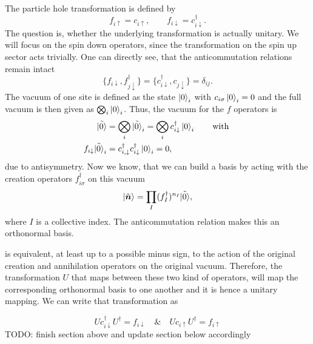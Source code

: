 \documentclass[../../../main.tex]{subfiles}
\begin{document}
The particle hole transformation is defined by 
\begin{equation*}
    f_{i\uparrow}=c_{i\uparrow}, \qquad f_{i\downarrow}=c_{i\downarrow}^{\dagger} .
\end{equation*} 
The question is, whether the underlying transformation is actually unitary. We will focus on the spin down operators, since the transformation on the spin up sector acts trivially. One can directly see, that the anticommutation relations remain intact
\[
\{f_{i\downarrow},f_{j\downarrow}^{\dagger}\}
=\{c_{i\downarrow}^{\dagger},c_{j\downarrow}\}=\delta_{ij} .
\]
The vacuum of one site is defined as the state $\left\lvert 0 \right\rangle_i$ with $c_{i\sigma} \left\lvert 0 \right\rangle_i = 0$ and the full vacuum is then given as $\bigotimes_i \left\lvert 0 \right\rangle_i$. Thus, the vacuum for the $f$ operators is 
\begin{align*}
\tilde{\left\lvert 0 \right\rangle} &= \bigotimes_i \tilde{\left\lvert 0 \right\rangle}_i =
\bigotimes_i c_{i\downarrow}^{\dagger}\left\lvert 0 \right\rangle_i \qquad \text{with } \\
f_{i\downarrow} \tilde{\left\lvert 0 \right\rangle}_i&= c^\dagger_{i,\downarrow} c_{i\downarrow}^{\dagger}\left\lvert 0 \right\rangle_i = 0 ,
\end{align*}
due to antisymmetry. Now we know, that we can build a basis by acting with the creation operators $f^\dagger_{i\sigma}$ on this vacuum 
\begin{equation*}
    \left\lvert \tilde{ \bm n} \right\rangle = \prod_{I} (f_I^\dagger)^{n_I} \tilde{\left\lvert 0 \right\rangle} ,
\end{equation*}
where $I$ is a collective index. The anticommutation relation makes this an orthonormal basis.


is equivalent, at least up to a possible minus sign, to the action of the original creation and annihilation operators on the original vacuum. Therefore, the transformation $U$ that maps between these two kind of operators, will map the corresponding orthonormal basis to one another and it is hence a unitary mapping. We can write that transformation as

\[
U c_{i\downarrow}^{\dagger} U^{\dagger}=f_{i\downarrow}
\quad\text{\&}\quad U c_{i\uparrow} U^{\dagger}=f_{i\uparrow}
\]
TODO: finish section above and update section below accordingly
\end{document}
